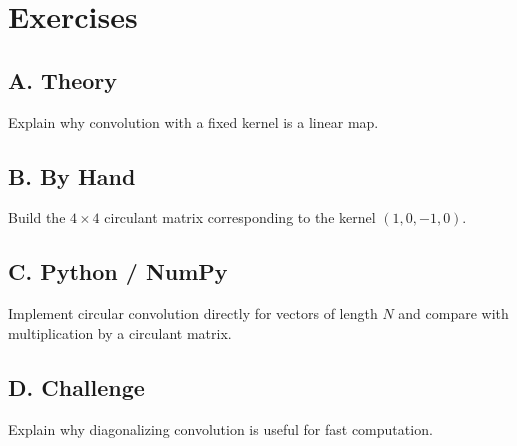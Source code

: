 \section*{Exercises}
\subsection*{A. Theory}
\begin{exercise} Explain why convolution with a fixed kernel is a linear map. \end{exercise}
\subsection*{B. By Hand}
\begin{exercise} Build the $4\times 4$ circulant matrix corresponding to the kernel $(1,0,-1,0)$. \end{exercise}
\subsection*{C. Python / NumPy}
\begin{exercise} Implement circular convolution directly for vectors of length $N$ and compare with multiplication by a circulant matrix. \end{exercise}
\subsection*{D. Challenge}
\begin{exercise} Explain why diagonalizing convolution is useful for fast computation. \end{exercise}
